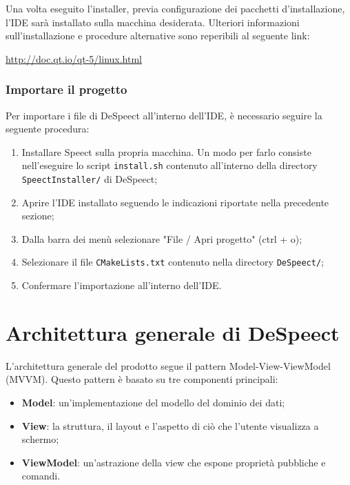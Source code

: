 \documentclass[openany,12pt,a4paper]{report}
\begin{document}
	\noindent Una volta eseguito l'installer, previa configurazione dei pacchetti d'installazione, l'IDE sarà installato sulla macchina desiderata. Ulteriori informazioni sull'installazione e procedure alternative sono reperibili al seguente link:
	\begin{center}
		\url{http://doc.qt.io/qt-5/linux.html}
	\end{center} 
	
	\subsection{Importare il progetto}  
	
	Per importare i file di DeSpeect all'interno dell'IDE, è necessario seguire la seguente procedura:
	\begin{enumerate}
		\item Installare Speect sulla propria macchina. Un modo per farlo consiste nell'eseguire lo script \verb|install.sh| contenuto all'interno della directory \verb|SpeectInstaller/| di DeSpeect;
		\item Aprire l'IDE installato seguendo le indicazioni riportate nella precedente sezione;
		\item Dalla barra dei menù selezionare "File / Apri progetto" (ctrl + o);
		\item Selezionare il file \verb|CMakeLists.txt| contenuto nella directory \verb|DeSpeect/|;
		\item Confermare l'importazione all'interno dell'IDE.
	\end{enumerate}
	

\chapter{Architettura generale di DeSpeect}

L'architettura generale del prodotto segue il pattern Model-View-ViewModel (MVVM). Questo pattern è basato su tre componenti principali:

\begin{itemize}
	\item \textbf{Model}: un'implementazione del modello del dominio dei dati;
	\item \textbf{View}: la struttura, il layout e l'aspetto di ciò che l'utente visualizza a schermo;
	\item \textbf{ViewModel}: un'astrazione della view che espone proprietà pubbliche e comandi.
\end{itemize}
\end{document}
